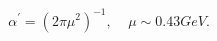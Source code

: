 \begin{equation}                              
\alpha^{'} = (2 \pi \mu^{2})^{-1}, ~~~~~ \mu \sim 0.43 GeV.   \label{eq:alp}                              
\end{equation} 
